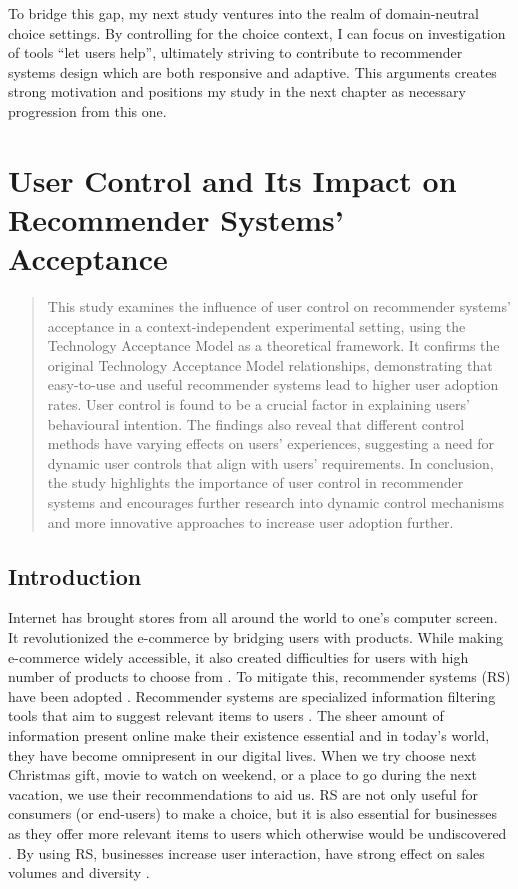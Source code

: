 \documentclass[a4paper,12pt]{article}
\begin{document}
To bridge this gap, my next study ventures into the realm of domain-neutral choice settings. By controlling for the choice context, I can focus on investigation of tools ``let users help'', ultimately striving to contribute to recommender systems design which are both responsive and adaptive. This arguments creates strong motivation and positions my study in the next chapter as necessary progression from this one.


\newpage


\section{User Control and Its Impact on Recommender Systems' Acceptance}\label{chapter:UserControlAndRS}
\begin{abstract}

    This study examines the influence of user control on recommender systems' acceptance in a context-independent experimental setting, using the Technology Acceptance Model as a theoretical framework. It confirms the original  Technology Acceptance Model relationships, demonstrating that easy-to-use and useful recommender systems lead to higher user adoption rates. User control is found to be a crucial factor in explaining users' behavioural  intention. The findings also reveal that different control methods have varying effects on users' experiences, suggesting a need for dynamic user controls that align with users' requirements. In conclusion, the study highlights the importance of user control in recommender systems and encourages further research into dynamic control mechanisms and more innovative approaches to increase user adoption further.
    
\end{abstract}

\subsection{Introduction}

Internet has brought stores from all around the world to one's computer screen. It revolutionized the e-commerce by bridging users with products. While making e-commerce widely accessible, it also created difficulties for users with high number of products to choose from \citep{ricci2011introduction}. To mitigate this, recommender systems (RS) have been adopted \citep{kotkovSurveySerendipityRecommender2016}. Recommender systems are specialized information filtering tools that aim to suggest relevant items to users \citep{adomavicius2005toward}. The sheer amount of information present online make their existence essential and in today's  world, they have become omnipresent in our digital lives. When we try choose next Christmas gift, movie to watch on weekend, or a place to go during the next vacation, we use their recommendations to aid us. RS are not only useful for consumers (or end-users) to make a choice, but it is also essential for businesses as they offer more relevant items to users which otherwise would be undiscovered \citep{ricci2011introduction}. By using RS, businesses increase user interaction, have strong effect on sales volumes and diversity \citep{songWhenHowDiversify2019}.
\end{document}
